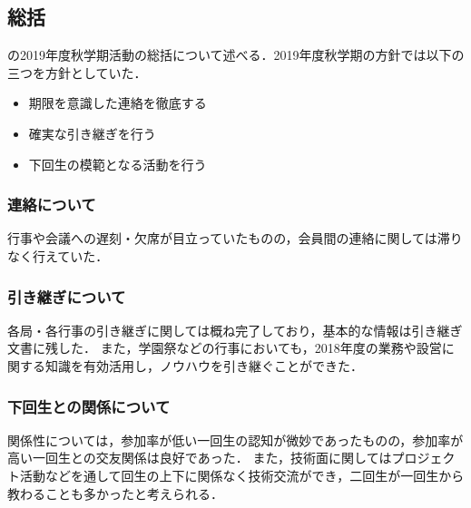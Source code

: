 \subsection*{\secondGrade{}総括}


\secondGrade{}の2019年度秋学期活動の総括について述べる．2019年度秋学期の方針では以下の三つを方針としていた．
\begin{itemize}
    \item 期限を意識した連絡を徹底する
    \item 確実な引き継ぎを行う
    \item 下回生の模範となる活動を行う

\end{itemize}

\subsubsection*{連絡について}
行事や会議への遅刻・欠席が目立っていたものの，会員間の連絡に関しては滞りなく行えていた． 
\subsubsection*{引き継ぎについて}
各局・各行事の引き継ぎに関しては概ね完了しており，基本的な情報は引き継ぎ文書に残した．
また，学園祭などの行事においても，2018年度の業務や設営に関する知識を有効活用し，ノウハウを引き継ぐことができた． 
\subsubsection*{下回生との関係について}
関係性については，参加率が低い一回生の認知が微妙であったものの，参加率が高い一回生との交友関係は良好であった．
また，技術面に関してはプロジェクト活動などを通して回生の上下に関係なく技術交流ができ，二回生が一回生から教わることも多かったと考えられる．